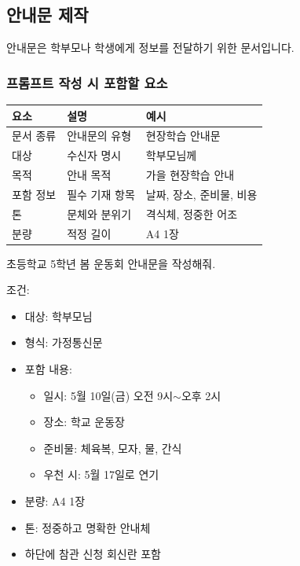 \documentclass[11pt,a4paper]{article}
\begin{document}
\newpage

\subsection{안내문 제작}

안내문은 학부모나 학생에게 정보를 전달하기 위한 문서입니다.

\subsubsection{프롬프트 작성 시 포함할 요소}

\begin{center}
\begin{tabular}{|l|l|l|}
\hline
\rowcolor{lightblue}
\textbf{요소} & \textbf{설명} & \textbf{예시} \\
\hline
문서 종류 & 안내문의 유형 & 현장학습 안내문 \\
\hline
대상 & 수신자 명시 & 학부모님께 \\
\hline
목적 & 안내 목적 & 가을 현장학습 안내 \\
\hline
포함 정보 & 필수 기재 항목 & 날짜, 장소, 준비물, 비용 \\
\hline
톤 & 문체와 분위기 & 격식체, 정중한 어조 \\
\hline
분량 & 적정 길이 & A4 1장 \\
\hline
\end{tabular}
\end{center}

\begin{examplebox}
초등학교 5학년 봄 운동회 안내문을 작성해줘.

조건:
\begin{itemize}[noitemsep]
  \item 대상: 학부모님
  \item 형식: 가정통신문
  \item 포함 내용:
    \begin{itemize}[noitemsep]
      \item 일시: 5월 10일(금) 오전 9시$\sim$오후 2시
      \item 장소: 학교 운동장
      \item 준비물: 체육복, 모자, 물, 간식
      \item 우천 시: 5월 17일로 연기
    \end{itemize}
  \item 분량: A4 1장
  \item 톤: 정중하고 명확한 안내체
  \item 하단에 참관 신청 회신란 포함
\end{itemize}
\end{examplebox}
\end{document}
